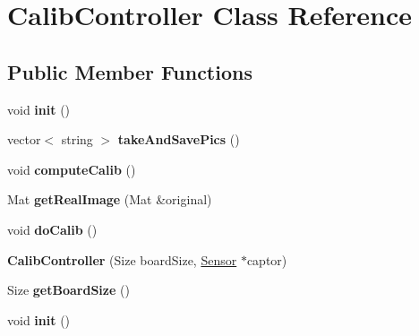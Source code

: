 \hypertarget{class_calib_controller}{\section{Calib\-Controller Class Reference}
\label{class_calib_controller}
}
\subsection*{Public Member Functions}
\begin{DoxyCompactItemize}
\item 
\hypertarget{class_calib_controller_a40eb2511d1666b5fc105b5d3018f8976}{void {\bfseries init} ()}\label{class_calib_controller_a40eb2511d1666b5fc105b5d3018f8976}

\item 
\hypertarget{class_calib_controller_afeb31602e51c3a6e1206f8dd27f85ca2}{vector$<$ string $>$ {\bfseries take\-And\-Save\-Pics} ()}\label{class_calib_controller_afeb31602e51c3a6e1206f8dd27f85ca2}

\item 
\hypertarget{class_calib_controller_a1e4505d8fd2f7ce275fec12a10e1c591}{void {\bfseries compute\-Calib} ()}\label{class_calib_controller_a1e4505d8fd2f7ce275fec12a10e1c591}

\item 
\hypertarget{class_calib_controller_a01093e8a1e478e536dafdba833b24d57}{Mat {\bfseries get\-Real\-Image} (Mat \&original)}\label{class_calib_controller_a01093e8a1e478e536dafdba833b24d57}

\item 
\hypertarget{class_calib_controller_ab5118d61dbbb24ca2b88713f56666540}{void {\bfseries do\-Calib} ()}\label{class_calib_controller_ab5118d61dbbb24ca2b88713f56666540}

\item 
\hypertarget{class_calib_controller_a9a77e4bf8ef429ee4738c7d7c7e7be25}{{\bfseries Calib\-Controller} (Size board\-Size, \hyperlink{class_sensor}{Sensor} $\ast$captor)}\label{class_calib_controller_a9a77e4bf8ef429ee4738c7d7c7e7be25}

\item 
\hypertarget{class_calib_controller_ad5f91606cb01ac9ee3da9c8dfc90495c}{Size {\bfseries get\-Board\-Size} ()}\label{class_calib_controller_ad5f91606cb01ac9ee3da9c8dfc90495c}

\item 
\hypertarget{class_calib_controller_a40eb2511d1666b5fc105b5d3018f8976}{void {\bfseries init} ()}\label{class_calib_controller_a40eb2511d1666b5fc105b5d3018f8976}


\end{DoxyCompactItemize}
